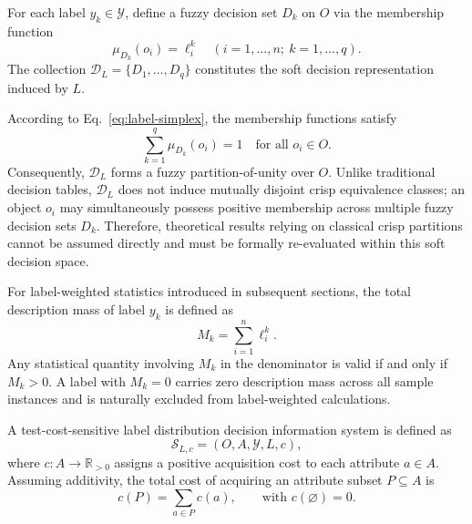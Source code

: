 \begin{definition}
	\label{def:soft-decision}
	For each label $y_k \in \mathcal{Y}$, define a fuzzy decision set $D_k$ on $O$ via the membership function
	\begin{equation}
		\mu_{D_k}(o_i) = \ell_i^k \quad (i=1,\dots,n;\ k=1,\dots,q).
		\label{eq:soft-decision}
	\end{equation}
	The collection $\mathcal{D}_L = \{D_1, \dots, D_q\}$ constitutes the soft decision representation induced by $L$.
\end{definition}

According to Eq.~\eqref{eq:label-simplex}, the membership functions satisfy
\begin{equation}
	\sum_{k=1}^q \mu_{D_k}(o_i) = 1 \quad \text{for all } o_i \in O.
	\label{eq:soft-partition}
\end{equation}
Consequently, $\mathcal{D}_L$ forms a fuzzy partition-of-unity over $O$. Unlike traditional decision tables, $\mathcal{D}_L$ does not induce mutually disjoint crisp equivalence classes; an object $o_i$ may simultaneously possess positive membership across multiple fuzzy decision sets $D_k$. Therefore, theoretical results relying on classical crisp partitions cannot be assumed directly and must be formally re-evaluated within this soft decision space.

For label-weighted statistics introduced in subsequent sections, the total description mass of label $y_k$ is defined as
\begin{equation}
	M_k = \sum_{i=1}^n \ell_i^k.
	\label{eq:label-mass}
\end{equation}
Any statistical quantity involving $M_k$ in the denominator is valid if and only if $M_k > 0$. A label with $M_k = 0$ carries zero description mass across all sample instances and is naturally excluded from label-weighted calculations.

\begin{definition}
	\label{def:test-cost}
	A test-cost-sensitive label distribution decision information system is defined as
	\[
	\mathcal{S}_{L,c} = (O, A, \mathcal{Y}, L, c),
	\]
	where $c: A \to \mathbb{R}_{>0}$ assigns a positive acquisition cost to each attribute $a \in A$. Assuming additivity, the total cost of acquiring an attribute subset $P \subseteq A$ is
	\begin{equation}
		c(P) = \sum_{a \in P} c(a), \qquad \text{with } c(\varnothing) = 0.
		\label{eq:additive-cost}
	\end{equation}
\end{definition}

